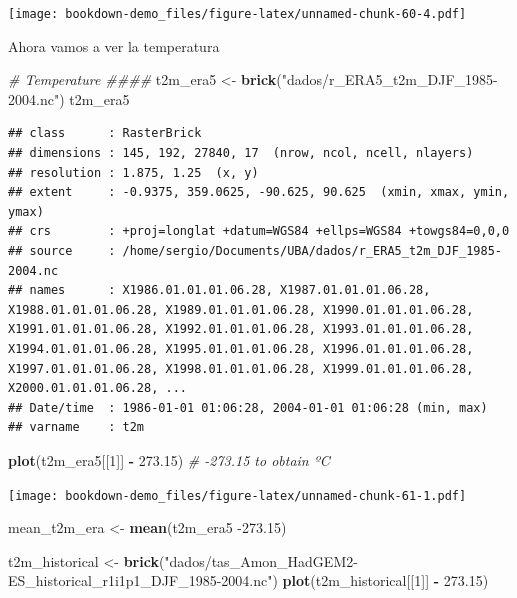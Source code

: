 \documentclass[]{book}
\newenvironment{Shaded}{\begin{snugshade}}{\end{snugshade}}
\newcommand{\CommentTok}[1]{\textcolor[rgb]{0.56,0.35,0.01}{\textit{#1}}}
\newcommand{\DecValTok}[1]{\textcolor[rgb]{0.00,0.00,0.81}{#1}}
\newcommand{\FloatTok}[1]{\textcolor[rgb]{0.00,0.00,0.81}{#1}}
\newcommand{\KeywordTok}[1]{\textcolor[rgb]{0.13,0.29,0.53}{\textbf{#1}}}
\newcommand{\NormalTok}[1]{#1}
\newcommand{\OperatorTok}[1]{\textcolor[rgb]{0.81,0.36,0.00}{\textbf{#1}}}
\newcommand{\StringTok}[1]{\textcolor[rgb]{0.31,0.60,0.02}{#1}}
\begin{document}
\texttt{[image: bookdown-demo\_files/figure-latex/unnamed-chunk-60-4.pdf]}

Ahora vamos a ver la temperatura

\begin{Shaded}
\begin{Highlighting}[]
\CommentTok{# Temperature ####}
\NormalTok{t2m_era5 <-}\StringTok{ }\KeywordTok{brick}\NormalTok{(}\StringTok{"dados/r_ERA5_t2m_DJF_1985-2004.nc"}\NormalTok{)}
\NormalTok{t2m_era5}
\end{Highlighting}
\end{Shaded}

\begin{verbatim}
## class      : RasterBrick 
## dimensions : 145, 192, 27840, 17  (nrow, ncol, ncell, nlayers)
## resolution : 1.875, 1.25  (x, y)
## extent     : -0.9375, 359.0625, -90.625, 90.625  (xmin, xmax, ymin, ymax)
## crs        : +proj=longlat +datum=WGS84 +ellps=WGS84 +towgs84=0,0,0 
## source     : /home/sergio/Documents/UBA/dados/r_ERA5_t2m_DJF_1985-2004.nc 
## names      : X1986.01.01.01.06.28, X1987.01.01.01.06.28, X1988.01.01.01.06.28, X1989.01.01.01.06.28, X1990.01.01.01.06.28, X1991.01.01.01.06.28, X1992.01.01.01.06.28, X1993.01.01.01.06.28, X1994.01.01.01.06.28, X1995.01.01.01.06.28, X1996.01.01.01.06.28, X1997.01.01.01.06.28, X1998.01.01.01.06.28, X1999.01.01.01.06.28, X2000.01.01.01.06.28, ... 
## Date/time  : 1986-01-01 01:06:28, 2004-01-01 01:06:28 (min, max)
## varname    : t2m
\end{verbatim}

\begin{Shaded}
\begin{Highlighting}[]
\KeywordTok{plot}\NormalTok{(t2m_era5[[}\DecValTok{1}\NormalTok{]] }\OperatorTok{-}\StringTok{ }\FloatTok{273.15}\NormalTok{)      }\CommentTok{# -273.15 to obtain ºC}
\end{Highlighting}
\end{Shaded}

\texttt{[image: bookdown-demo\_files/figure-latex/unnamed-chunk-61-1.pdf]}

\begin{Shaded}
\begin{Highlighting}[]
\NormalTok{mean_t2m_era <-}\StringTok{ }\KeywordTok{mean}\NormalTok{(t2m_era5 }\FloatTok{-273.15}\NormalTok{)}

\NormalTok{t2m_historical <-}\StringTok{ }\KeywordTok{brick}\NormalTok{(}\StringTok{"dados/tas_Amon_HadGEM2-ES_historical_r1i1p1_DJF_1985-2004.nc"}\NormalTok{)}
\KeywordTok{plot}\NormalTok{(t2m_historical[[}\DecValTok{1}\NormalTok{]] }\OperatorTok{-}\StringTok{ }\FloatTok{273.15}\NormalTok{)}
\end{Highlighting}
\end{Shaded}
\end{document}
